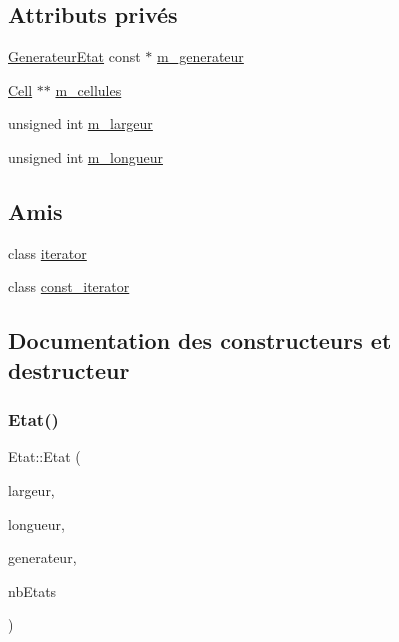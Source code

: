 \subsection*{Attributs privés}
\begin{DoxyCompactItemize}
\item 
\mbox{\hyperlink{class_generateur_etat}{Generateur\+Etat}} const  $\ast$ \mbox{\hyperlink{class_etat_a15bd9b75fe2fe7a556afce7958f82e08}{m\+\_\+generateur}}
\item 
\mbox{\hyperlink{class_cell}{Cell}} $\ast$$\ast$ \mbox{\hyperlink{class_etat_ad174c3c55c15e9d8274f1c4b78af01bd}{m\+\_\+cellules}}
\item 
unsigned int \mbox{\hyperlink{class_etat_af575fb141b3c300c9cbb61337094ba1b}{m\+\_\+largeur}}
\item 
unsigned int \mbox{\hyperlink{class_etat_af45c3a2898f8b1aed04c6f21705735b0}{m\+\_\+longueur}}
\end{DoxyCompactItemize}
\subsection*{Amis}
\begin{DoxyCompactItemize}
\item 
class \mbox{\hyperlink{class_etat_a67171474c4da6cc8efe0c7fafefd2b2d}{iterator}}
\item 
class \mbox{\hyperlink{class_etat_ac220ce1c155db1ac44146c12d178056f}{const\+\_\+iterator}}
\end{DoxyCompactItemize}


\subsection{Documentation des constructeurs et destructeur}
\mbox{\label{class_etat_a419cff1c3aa750391d0aa71fe0c84446}} 
\subsubsection{\texorpdfstring{Etat()}{Etat()}\hspace{0.1cm}{\footnotesize\ttfamily [1/4]}}
{\footnotesize\ttfamily Etat\+::\+Etat (\begin{DoxyParamCaption}\item[{unsigned int}]{largeur,  }\item[{unsigned int}]{longueur,  }\item[{\mbox{\hyperlink{class_generateur_etat}{Generateur\+Etat}} const \&}]{generateur,  }\item[{unsigned int}]{nb\+Etats }\end{DoxyParamCaption})}

